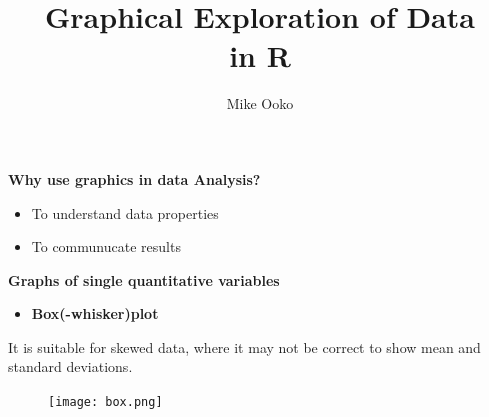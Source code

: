 \documentclass[xcolor=dvipsnames , 11pt]{beamer}
\begin{document}



\title{\textbf{Graphical Exploration of Data \\
in R}}
\author{Mike Ooko}
\titlepage{}

\begin{frame}{\textbf{Why use graphics in data Analysis?}}

\begin{itemize}
\item{To understand data properties}
\item{To communucate results}
\end{itemize}
\end{frame}



\begin{frame}{\textbf{Graphs of single quantitative variables}}
\begin{itemize}
\item{\textbf{Box(-whisker)plot}}
\end{itemize}
It is suitable for skewed data, where it may not be correct to show mean and standard deviations.
\begin{figure}
\texttt{[image: box.png]}
\end{figure}

\end{frame}
\end{document}

